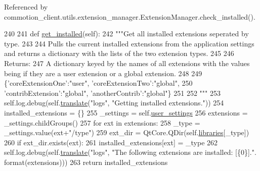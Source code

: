 Referenced by commotion\+\_\+client.\+utils.\+extension\+\_\+manager.\+Extension\+Manager.\+check\+\_\+installed().


\begin{DoxyCode}
240 
241     \textcolor{keyword}{def }\hyperlink{classcommotion__client_1_1utils_1_1extension__manager_1_1ExtensionManager_aa2b5054f6495fbc20e556f5713550d01}{get\_installed}(self):
242         \textcolor{stringliteral}{"""Get all installed extensions seperated by type.}
243 \textcolor{stringliteral}{}
244 \textcolor{stringliteral}{        Pulls the current installed extensions from the application settings and returns a dictionary with
       the lists of the two extension types.}
245 \textcolor{stringliteral}{}
246 \textcolor{stringliteral}{        Returns:}
247 \textcolor{stringliteral}{          A dictionary keyed by the names of all extensions with the values being if they are a user
       extension or a global extension.}
248 \textcolor{stringliteral}{}
249 \textcolor{stringliteral}{          \{'coreExtensionOne':"user", 'coreExtensionTwo':"global",}
250 \textcolor{stringliteral}{           'contribExtension':"global", 'anotherContrib':"global"\}}
251 \textcolor{stringliteral}{}
252 \textcolor{stringliteral}{        """}
253         self.log.debug(self.\hyperlink{classcommotion__client_1_1utils_1_1extension__manager_1_1ExtensionManager_a2cfd032ca383c3fd6f0f52b99b6dd67c}{translate}(\textcolor{stringliteral}{"logs"}, \textcolor{stringliteral}{"Getting installed extensions."}))
254         installed\_extensions = \{\}
255         \_settings = self.\hyperlink{classcommotion__client_1_1utils_1_1extension__manager_1_1ExtensionManager_a0fa8b2be1171ded73629a01c50472d34}{user\_settings}
256         extensions = \_settings.childGroups()
257         \textcolor{keywordflow}{for} ext \textcolor{keywordflow}{in} extensions:
258             \_type = \_settings.value(ext+\textcolor{stringliteral}{"/type"})
259             ext\_dir = QtCore.QDir(self.\hyperlink{classcommotion__client_1_1utils_1_1extension__manager_1_1ExtensionManager_a28e035496b4d544179f934b3c401c0c1}{libraries}[\_type])
260             \textcolor{keywordflow}{if} ext\_dir.exists(ext):
261                 installed\_extensions[ext] = \_type
262         self.log.debug(self.\hyperlink{classcommotion__client_1_1utils_1_1extension__manager_1_1ExtensionManager_a2cfd032ca383c3fd6f0f52b99b6dd67c}{translate}(\textcolor{stringliteral}{"logs"}, \textcolor{stringliteral}{"The following extensions are installed: [\{0\}]."}.
      format(extensions)))
263         \textcolor{keywordflow}{return} installed\_extensions
            
\end{DoxyCode}
